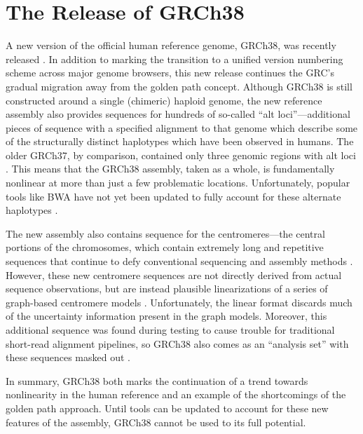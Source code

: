 \documentclass[11pt,proposal]{ucthesis}
\begin{document}
        

\section{The Release of GRCh38}

A new version of the official human reference genome, GRCh38, was recently released \cite{karolchik2014new}. In addition to marking the transition to a unified version numbering scheme across major genome browsers, this new release continues the GRC's gradual migration away from the golden path concept. Although GRCh38 is still constructed around a single (chimeric) haploid genome, the new reference assembly also provides sequences for hundreds of so-called ``alt loci''---additional pieces of sequence with a specified alignment to that genome which describe some of the structurally distinct haplotypes which have been observed in humans. The older GRCh37, by comparison, contained only three genomic regions with alt loci \cite{church2011modernizing}. This means that the GRCh38 assembly, taken as a whole, is fundamentally nonlinear at more than just a few problematic locations. Unfortunately, popular tools like BWA have not yet been updated to fully account for these alternate haplotypes \cite{li2014bwa}.

The new assembly also contains sequence for the centromeres---the central portions of the chromosomes, which contain extremely long and repetitive sequences that continue to defy conventional sequencing and assembly methods \cite{karolchik2014new}. However, these new centromere sequences are not directly derived from actual sequence observations, but are instead plausible linearizations of a series of graph-based centromere models \cite{miga2014centromere}. Unfortunately, the linear format discards much of the uncertainty information present in the graph models. Moreover, this additional sequence was found during testing to cause trouble for traditional short-read alignment pipelines, so GRCh38 also comes as an ``analysis set'' with these sequences masked out \cite{karolchik2014new}.

In summary, GRCh38 both marks the continuation of a trend towards nonlinearity in the human reference and an example of the shortcomings of the golden path approach. Until tools can be updated to account for these new features of the assembly, GRCh38 cannot be used to its full potential.
\end{document}
